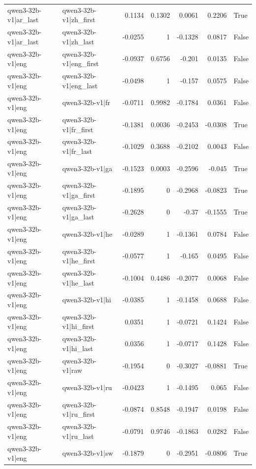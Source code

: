 \begin{table}
\begin{tabular}{l l r r r r l}
qwen3-32b-v1|ar_last & qwen3-32b-v1|zh_first & 0.1134 & 0.1302 & 0.0061 & 0.2206 & True \\
qwen3-32b-v1|ar_last & qwen3-32b-v1|zh_last & -0.0255 & 1 & -0.1328 & 0.0817 & False \\
qwen3-32b-v1|eng & qwen3-32b-v1|eng_first & -0.0937 & 0.6756 & -0.201 & 0.0135 & False \\
qwen3-32b-v1|eng & qwen3-32b-v1|eng_last & -0.0498 & 1 & -0.157 & 0.0575 & False \\
qwen3-32b-v1|eng & qwen3-32b-v1|fr & -0.0711 & 0.9982 & -0.1784 & 0.0361 & False \\
qwen3-32b-v1|eng & qwen3-32b-v1|fr_first & -0.1381 & 0.0036 & -0.2453 & -0.0308 & True \\
qwen3-32b-v1|eng & qwen3-32b-v1|fr_last & -0.1029 & 0.3688 & -0.2102 & 0.0043 & False \\
qwen3-32b-v1|eng & qwen3-32b-v1|ga & -0.1523 & 0.0003 & -0.2596 & -0.045 & True \\
qwen3-32b-v1|eng & qwen3-32b-v1|ga_first & -0.1895 & 0 & -0.2968 & -0.0823 & True \\
qwen3-32b-v1|eng & qwen3-32b-v1|ga_last & -0.2628 & 0 & -0.37 & -0.1555 & True \\
qwen3-32b-v1|eng & qwen3-32b-v1|he & -0.0289 & 1 & -0.1361 & 0.0784 & False \\
qwen3-32b-v1|eng & qwen3-32b-v1|he_first & -0.0577 & 1 & -0.165 & 0.0495 & False \\
qwen3-32b-v1|eng & qwen3-32b-v1|he_last & -0.1004 & 0.4486 & -0.2077 & 0.0068 & False \\
qwen3-32b-v1|eng & qwen3-32b-v1|hi & -0.0385 & 1 & -0.1458 & 0.0688 & False \\
qwen3-32b-v1|eng & qwen3-32b-v1|hi_first & 0.0351 & 1 & -0.0721 & 0.1424 & False \\
qwen3-32b-v1|eng & qwen3-32b-v1|hi_last & 0.0356 & 1 & -0.0717 & 0.1428 & False \\
qwen3-32b-v1|eng & qwen3-32b-v1|raw & -0.1954 & 0 & -0.3027 & -0.0881 & True \\
qwen3-32b-v1|eng & qwen3-32b-v1|ru & -0.0423 & 1 & -0.1495 & 0.065 & False \\
qwen3-32b-v1|eng & qwen3-32b-v1|ru_first & -0.0874 & 0.8548 & -0.1947 & 0.0198 & False \\
qwen3-32b-v1|eng & qwen3-32b-v1|ru_last & -0.0791 & 0.9746 & -0.1863 & 0.0282 & False \\
qwen3-32b-v1|eng & qwen3-32b-v1|sw & -0.1879 & 0 & -0.2951 & -0.0806 & True \\

\end{tabular}
\end{table}
